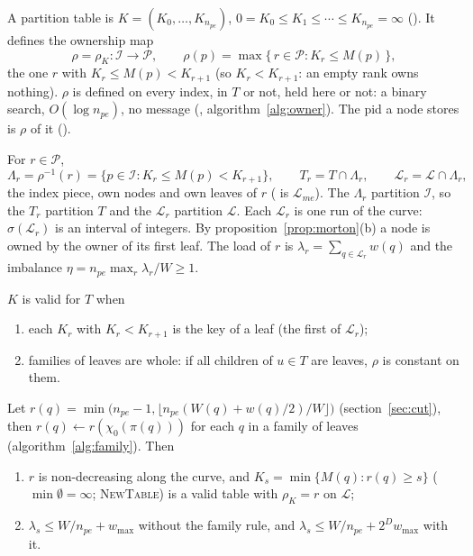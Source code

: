 \begin{definition}
  \label{def:owner}
  A partition table is $K = (K_0, \ldots, K_{n_{pe}})$, $0 = K_0 \le K_1 \le
  \cdots \le K_{n_{pe}} = \infty$ (). It defines the
  ownership map
  \[
    \rho = \rho_K : \mathcal{I} \to \mathcal{P}, \qquad
    \rho(p) = \max\{\, r \in \mathcal{P} : K_r \le M(p) \,\},
  \]
  the one $r$ with $K_r \le M(p) < K_{r+1}$ (so $K_r < K_{r+1}$: an empty
  rank owns nothing). $\rho$ is defined on every index, in $T$ or not,
  held here or not: a binary search, $O(\log n_{pe})$, no message
  (, algorithm~\ref{alg:owner}). The pid a node stores
  is $\rho$ of it ().
\end{definition}

\begin{definition}
  \label{def:local}
  For $r \in \mathcal{P}$,
  \[
    \Lambda_r = \rho^{-1}(r) = \{p \in \mathcal{I} : K_r \le M(p) <
      K_{r+1}\}, \qquad
    T_r = T \cap \Lambda_r, \qquad
    \mathcal{L}_r = \mathcal{L} \cap \Lambda_r,
  \]
  the index piece, own nodes and own leaves of $r$ ( is $\mathcal{L}_{me}$). The $\Lambda_r$ partition
  $\mathcal{I}$, so the $T_r$ partition $T$ and the $\mathcal{L}_r$
  partition $\mathcal{L}$. Each $\mathcal{L}_r$ is one run of the curve:
  $\sigma(\mathcal{L}_r)$ is an interval of integers. By
  proposition~\ref{prop:morton}(b) a node is owned by the owner of its
  first leaf. The load of $r$ is $\lambda_r = \sum_{q \in \mathcal{L}_r}
  w(q)$ and the imbalance $\eta = n_{pe} \max_r \lambda_r / W \ge 1$.
\end{definition}

\begin{definition}
  \label{def:valid}
  $K$ is valid for $T$ when
  \begin{enumerate}[label=(V\arabic*)]
    \item each $K_r$ with $K_r < K_{r+1}$ is the key of a leaf (the first
      of $\mathcal{L}_r$);
    \item families of leaves are whole: if all children of $u \in T$ are
      leaves, $\rho$ is constant on them.
  \end{enumerate}
\end{definition}

\begin{proposition}
  \label{prop:cut}
  Let $r(q) = \min\big(n_{pe} - 1, \lfloor n_{pe}(W(q) + w(q)/2)/W
  \rfloor\big)$ (section~\ref{sec:cut}), then $r(q) \gets r(\chi_0(\pi(q)))$
  for each $q$ in a family of leaves (algorithm~\ref{alg:family}). Then
  \begin{enumerate}[label=(\alph*)]
    \item $r$ is non-decreasing along the curve, and $K_s = \min\{M(q) :
      r(q) \ge s\}$ ($\min \emptyset = \infty$; \textsc{NewTable}) is a
      valid table with $\rho_K = r$ on $\mathcal{L}$;
    \item $\lambda_s \le W/n_{pe} + w_{\max}$ without the family rule, and
      $\lambda_s \le W/n_{pe} + 2^D w_{\max}$ with it.
  \end{enumerate}
\end{proposition}

